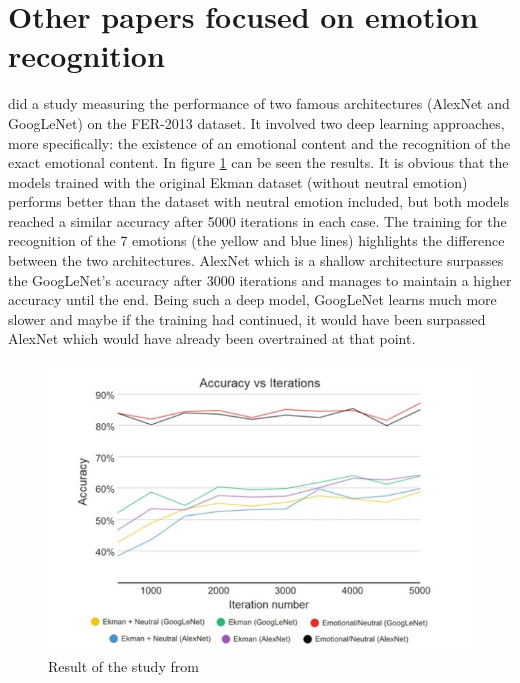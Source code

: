 \documentclass[runningheads,a4paper,12pt]{report}
\begin{document}
\section{Other papers focused on emotion recognition}
\cite{case-study-on-fer2013} did a study measuring the performance of two famous architectures (AlexNet and GoogLeNet) on the FER-2013 dataset. It involved two deep learning approaches, more specifically: the existence of an emotional content and the recognition of the exact emotional content. In figure \ref{fig:fer-study} can be seen the results. It is obvious that the models trained with the original Ekman dataset (without neutral emotion) performs better than the dataset with neutral emotion included, but both models reached a similar accuracy after 5000 iterations in each case. The training for the recognition of the 7 emotions (the yellow and blue lines) highlights the difference between the two architectures. AlexNet which is a shallow architecture surpasses the GoogLeNet's accuracy after 3000 iterations and manages to maintain a higher accuracy until the end. Being such a deep model, GoogLeNet learns much more slower and maybe if the training had continued, it would have been surpassed AlexNet which would have already been overtrained at that point. 

\begin{figure}
	\centering

  	\includegraphics[width=\linewidth]{./images/2_fer_study}\hfill

    \caption{Result of the study from \cite{case-study-on-fer2013}}  
    \label{fig:fer-study}
\end{figure}
\end{document}

